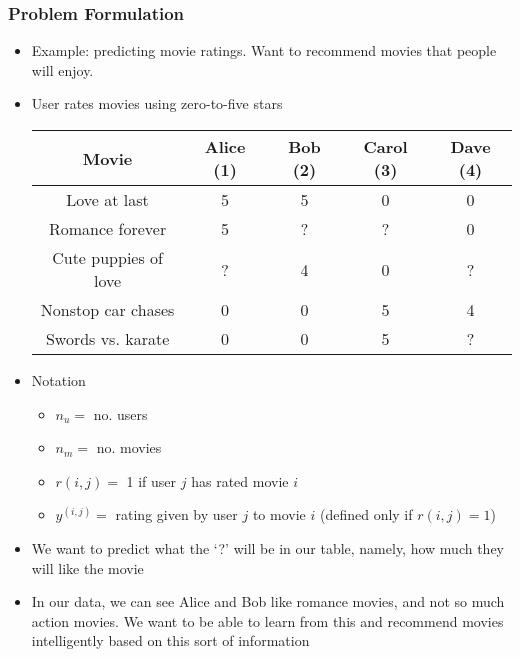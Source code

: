 \subsubsection{Problem Formulation}
\begin{itemize}[--]
	\item Example: predicting movie ratings. Want to recommend movies that people will enjoy.
	\item User rates movies using zero-to-five stars \\
	\begin{center}\begin{tabular}{c | c c c c}
		\textbf{Movie} & \textbf{Alice (1)} & \textbf{Bob (2)} & \textbf{Carol (3)} & \textbf{Dave (4)} \\ \hline
		Love at last & 5 & 5 & 0 & 0 \\
		Romance forever & 5 & ? & ? & 0 \\
		Cute puppies of love & ? & 4 & 0 & ? \\
		Nonstop car chases & 0 & 0 & 5 & 4 \\
		Swords vs. karate & 0 & 0 &  5 & ?
	\end{tabular}\end{center}
	\item Notation
	\begin{itemize}[--]
		\item $n_u=$ no. users
		\item $n_m=$ no. movies
		\item $r(i,j)=$ 1 if user $j$ has rated movie $i$
		\item $y^{(i,j)}=$ rating given by user $j$ to movie $i$ (defined only if $r(i,j)=1$)
	\end{itemize}
	\item We want to predict what the `?' will be in our table, namely, how much they will like the movie
	\item In our data, we can see Alice and Bob like romance movies, and not so much action movies. We want to be able to learn from this and recommend movies intelligently based on this sort of information
\end{itemize}

